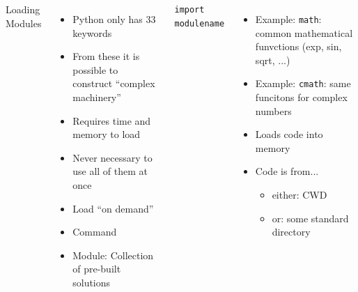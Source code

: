 \begin{frame}[fragile]
%
\begin{columns}
\begin{Large}
Loading Modules
\vspace{6pt}
\end{Large}
\begin{itemize}
\item Python only has 33 keywords
\item From these it is possible to construct \enquote{complex machinery}
\item Requires time and memory to load
\item Never necessary to use all of them at once
\item[\Thus] Load \enquote{on demand}
\item[\Thus] Command 
\item Module: Collection of pre-built solutions
\end{itemize}
%
\begin{codebox}
\begin{verbatim}
import modulename
\end{verbatim}
\end{codebox}
\begin{itemize}
\item Example: \texttt{math}: common mathematical funvctions (exp, sin, sqrt, ...)
\item Example: \texttt{cmath}: same funcitons for complex numbers
\item Loads code into memory
\item Code is from...
	\begin{itemize}
	\item either: CWD
	\item or: some standard directory
	\end{itemize}
\end{itemize}
\end{columns}
%
\end{frame}


